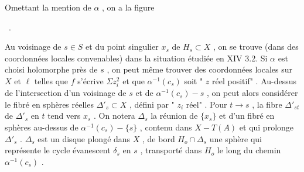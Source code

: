 Omettant la mention de $\alpha$ , on a la figure

\begin{center}
\ .
\end{center}
Au voisinage de $s \in S$ et du point singulier $x_s$ de $H_s \subset X$ , on se trouve (dans des coordonnées locales convenables) dans la situation étudiée en XIV 3.2. Si $\alpha$ est choisi holomorphe près de $s$ , on peut même trouver des coordonnées locales sur $X$ et $\ell$ telles que $f$ s'écrive $\Sigma z_i^2$ et que $\alpha^{-1}(c_s)$ soit " $z$ réel positif" . Au-dessus de l'intersection d'un voisinage de $s$ et de $\alpha^{-1}(c_s) - s$ , on peut alors considérer le fibré en sphères réelles $\Delta'_s \subset X$ , défini par " $z_i$ réel" . Pour $t \to s$ , la fibre $\Delta'_{st}$ de $\Delta'_s$ en $t$ tend vers $x_s$ . On notera $\Delta_s$ la réunion de $\{x_s\}$ et d'un fibré en sphères au-dessus de $\alpha^{-1}(c_s) - \{s\}$ , contenu dans $X - T(A)$ et qui prolonge $\Delta'_s$ . $\Delta_s$ est un disque plongé dans $X$ , de bord $H_o \cap \Delta_s$ une sphère qui représente le cycle évanescent $\delta_s$ en $s$ , transporté dans $H_o$ le long du chemin $\alpha^{-1}(c_s)$ .

